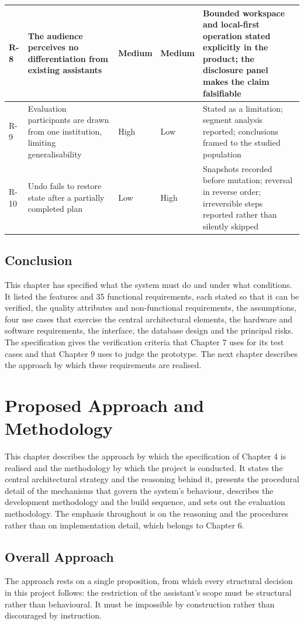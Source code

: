 \documentclass{FastFyp}
\begin{document}
{\begin{longtable}{|p{0.8cm}|p{3.6cm}|p{1.3cm}|p{1.3cm}|p{5.0cm}|}
\hline
R-8 & The audience perceives no differentiation from existing assistants & Medium & Medium & Bounded workspace and local-first operation stated explicitly in the product; the disclosure panel makes the claim falsifiable \\
\hline
R-9 & Evaluation participants are drawn from one institution, limiting generalisability & High & Low & Stated as a limitation; segment analysis reported; conclusions framed to the studied population \\
\hline
R-10 & Undo fails to restore state after a partially completed plan & Low & High & Snapshots recorded before mutation; reversal in reverse order; irreversible steps reported rather than silently skipped \\
\hline
\end{longtable}
}


\section{Conclusion}
This chapter has specified what the system must do and under what conditions. It listed the features and 35 functional requirements, each stated so that it can be verified, the quality attributes and non-functional requirements, the assumptions, four use cases that exercise the central architectural elements, the hardware and software requirements, the interface, the database design and the principal risks. The specification gives the verification criteria that Chapter 7 uses for its test cases and that Chapter 9 uses to judge the prototype. The next chapter describes the approach by which these requirements are realised.

\chapter{Proposed Approach and Methodology}
This chapter describes the approach by which the specification of Chapter 4 is realised and the methodology by which the project is conducted. It states the central architectural strategy and the reasoning behind it, presents the procedural detail of the mechanisms that govern the system's behaviour, describes the development methodology and the build sequence, and sets out the evaluation methodology. The emphasis throughout is on the reasoning and the procedures rather than on implementation detail, which belongs to Chapter 6.

\section{Overall Approach}
The approach rests on a single proposition, from which every structural decision in this project follows: the restriction of the assistant's scope must be structural rather than behavioural. It must be impossible by construction rather than discouraged by instruction.
\end{document}
